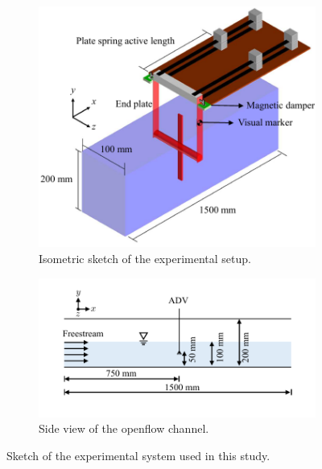 \documentclass[oneside]{utmthesis}
\begin{document}
\begin{figure}[!h]
  \centering
  \begin{subfigure}[h]{0.75\textwidth}
    \includegraphics[width=\textwidth]{figs/rigSketch}
    \caption{Isometric sketch of the experimental setup.}
    \label{fig:rigSketch}
  \end{subfigure}

  \begin{subfigure}[h]{0.75\textwidth}
    \includegraphics[width=\textwidth]{figs/channelSchematic}
    \caption{Side view of the openflow channel.}
    \label{fig:channelSchematic}
  \end{subfigure}

  \caption{Sketch of the experimental system used in this study.} \label{fig:experimentalSetup}
\end{figure}
\end{document}
